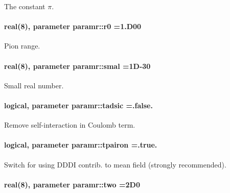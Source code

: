 The constant $ \pi $. 

\paragraph[{\texorpdfstring{r0}{r0}}]{\setlength{\rightskip}{0pt plus 5cm}real(8), parameter paramr\+::r0 =1.\+D00}\hypertarget{namespaceparamr_a063c9af80ff448638de55fbf7a5a81b9}{}\label{namespaceparamr_a063c9af80ff448638de55fbf7a5a81b9}


Pion range. 

\paragraph[{\texorpdfstring{smal}{smal}}]{\setlength{\rightskip}{0pt plus 5cm}real(8), parameter paramr\+::smal =1\+D-\/30}\hypertarget{namespaceparamr_a4011c8cb7093e8daade112c2cc14f536}{}\label{namespaceparamr_a4011c8cb7093e8daade112c2cc14f536}


Small real number. 

\paragraph[{\texorpdfstring{tadsic}{tadsic}}]{\setlength{\rightskip}{0pt plus 5cm}logical, parameter paramr\+::tadsic =.false.}\hypertarget{namespaceparamr_af3cdaaabc4241e21b1befbb1ca885452}{}\label{namespaceparamr_af3cdaaabc4241e21b1befbb1ca885452}


Remove self-\/interaction in Coulomb term. 

\paragraph[{\texorpdfstring{tpairon}{tpairon}}]{\setlength{\rightskip}{0pt plus 5cm}logical, parameter paramr\+::tpairon =.true.}\hypertarget{namespaceparamr_acd8a21779b3d29dfe3626fe843905246}{}\label{namespaceparamr_acd8a21779b3d29dfe3626fe843905246}


Switch for using D\+D\+DI contrib. to mean field (strongly recommended). 

\paragraph[{\texorpdfstring{two}{two}}]{\setlength{\rightskip}{0pt plus 5cm}real(8), parameter paramr\+::two =2\+D0}\hypertarget{namespaceparamr_a58c4634badf6036e07adcbc71f2d3461}{}\label{namespaceparamr_a58c4634badf6036e07adcbc71f2d3461}


